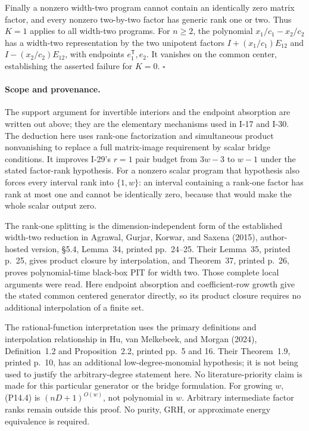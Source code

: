 \documentclass[11pt,a4paper]{article}
\theoremstyle{definition}\newtheorem{definition}{Definition}
\begin{document}
Finally a nonzero width-two program cannot contain an
identically zero matrix factor, and every nonzero two-by-two
factor has generic rank one or two. Thus $K=1$ applies to
all width-two programs. For $n\geq2$, the polynomial
$x_1/c_1-x_2/c_2$ has a width-two representation by the two
unipotent factors $I+(x_1/c_1)E_{12}$ and
$I-(x_2/c_2)E_{12}$, with endpoints $e_1^{\mathsf T},e_2$.
It vanishes on the common center, establishing the asserted
failure for $K=0$. $\square$

\paragraph{Scope and provenance.}
The support argument for invertible interiors and the endpoint
absorption are written out above; they are the elementary
mechanisms used in I-17 and I-30. The deduction here uses
rank-one factorization and simultaneous product nonvanishing
to replace a full matrix-image requirement by scalar bridge
conditions. It improves I-29's $r=1$ pair budget from $3w-3$
to $w-1$ under the stated factor-rank hypothesis. For a
nonzero scalar program that hypothesis also forces every
interval rank into $\{1,w\}$: an interval containing a rank-one
factor has rank at most one and cannot be identically zero,
because that would make the whole scalar output zero.

The rank-one splitting is the dimension-independent form of
the established width-two reduction in Agrawal, Gurjar,
Korwar, and Saxena (2015), author-hosted version,
\S5.4, Lemma~34, printed pp.~24--25. Their Lemma~35,
printed p.~25, gives product closure by interpolation, and
Theorem~37, printed p.~26, proves polynomial-time black-box
PIT for width two. Those complete local arguments were read.
Here endpoint absorption and coefficient-row growth give the
stated common centered generator directly, so its product
closure requires no additional interpolation of a finite set.

The rational-function interpretation uses the primary
definitions and interpolation relationship in Hu, van
Melkebeek, and Morgan (2024), Definition~1.2 and
Proposition~2.2, printed pp.~5 and 16. Their Theorem~1.9,
printed p.~10, has an additional low-degree-monomial
hypothesis; it is not being used to justify the arbitrary-degree
statement here. No literature-priority claim is made for
this particular generator or the bridge formulation.
For growing $w$, (P14.4) is $(nD+1)^{O(w)}$, not polynomial
in $w$. Arbitrary intermediate factor ranks remain outside
this proof. No purity, GRH, or approximate energy equivalence
is required.
\end{document}
